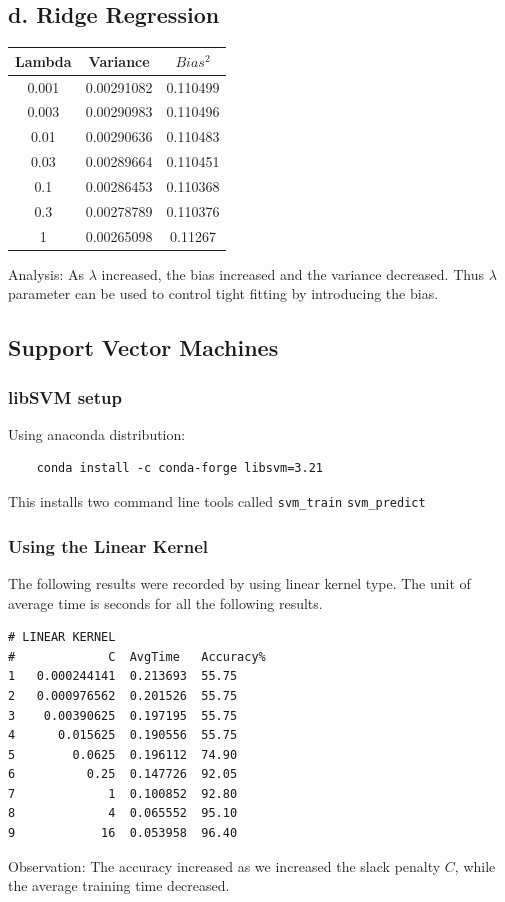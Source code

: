 \documentclass[letterpaper,doc,notimes]{apa6}
\begin{document}
\subsection{d. Ridge Regression}
\begin{tabular}{|c|c|c|} \hline
Lambda	&  Variance	 &  $Bias^2$ \\ \hline
0.001	& 0.00291082	 & 0.110499 \\
0.003	& 0.00290983	& 0.110496 \\
0.01	& 0.00290636	 & 0.110483 \\
0.03	& 0.00289664	& 0.110451 \\
0.1	 & 0.00286453	 & 0.110368 \\
0.3	& 0.00278789	& 0.110376 \\
1	 & 0.00265098	& 0.11267 \\ \hline
\end{tabular}

Analysis: 
  As $\lambda$ increased, the bias increased and the variance decreased. 
  Thus $\lambda$ parameter can be used to control tight fitting by introducing the bias.
  
\subsection{Support Vector Machines}
\subsubsection{libSVM setup}
Using anaconda distribution:
\begin{verbatim}
	conda install -c conda-forge libsvm=3.21
\end{verbatim}
This installs two command line tools called \texttt{svm\_train} \texttt{svm\_predict}

\subsubsection{Using the Linear Kernel} 
The following results were recorded by using linear kernel type. 
The unit of average time is seconds for all the following results.
\begin{verbatim}
# LINEAR KERNEL
#             C  AvgTime   Accuracy%
1   0.000244141  0.213693  55.75
2   0.000976562  0.201526  55.75
3    0.00390625  0.197195  55.75
4      0.015625  0.190556  55.75
5        0.0625  0.196112  74.90
6          0.25  0.147726  92.05
7             1  0.100852  92.80
8             4  0.065552  95.10
9            16  0.053958  96.40
\end{verbatim}
Observation: The accuracy increased as we increased the slack penalty $C$, while the average training time decreased.
\end{document}

